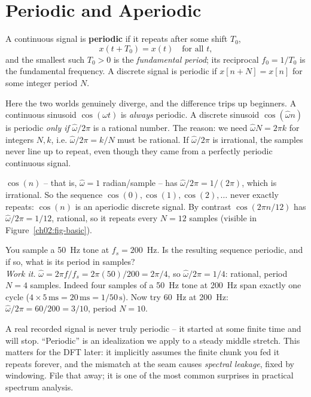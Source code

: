 \section{Periodic and Aperiodic}
\label{ch02:periodic}

A continuous signal is \textbf{periodic} if it repeats after some shift $T_0$,
\[
  x(t + T_0) = x(t) \quad \text{for all } t,
\]
and the smallest such $T_0 > 0$ is the \emph{fundamental period}; its reciprocal
$f_0 = 1/T_0$ is the fundamental frequency. A discrete signal is periodic if
$x[n+N] = x[n]$ for some integer period $N$.

Here the two worlds genuinely diverge, and the difference trips up beginners. A
continuous sinusoid $\cos(\omega t)$ is \emph{always} periodic. A discrete sinusoid
$\cos(\hat\omega n)$ is periodic \emph{only if} $\hat\omega/2\pi$ is a rational
number. The reason: we need $\hat\omega N = 2\pi k$ for integers $N, k$, i.e.
$\hat\omega/2\pi = k/N$ must be rational. If $\hat\omega/2\pi$ is irrational, the
samples never line up to repeat, even though they came from a perfectly periodic
continuous signal.

\begin{example}
\label{ch02:ex-aperiodic}
$\cos(n)$ -- that is, $\hat\omega = 1$ radian/sample -- has $\hat\omega/2\pi =
1/(2\pi)$, which is irrational. So the sequence $\cos(0), \cos(1), \cos(2), \dots$
never exactly repeats: $\cos(n)$ is an aperiodic discrete signal. By contrast
$\cos(2\pi n/12)$ has $\hat\omega/2\pi = 1/12$, rational, so it repeats every
$N=12$ samples (visible in Figure~\ref{ch02:fig-basic}).
\end{example}

\begin{walkbox}
You sample a 50~Hz tone at $f_s = 200$~Hz. Is the resulting sequence periodic, and
if so, what is its period in samples? \\[0.3em]
\emph{Work it.} $\hat\omega = 2\pi f/f_s = 2\pi (50)/200 = 2\pi/4$, so
$\hat\omega/2\pi = 1/4$: rational, period $N = 4$ samples. Indeed four samples of a
50~Hz tone at 200~Hz span exactly one cycle ($4 \times 5\,\text{ms} = 20\,\text{ms}
= 1/50\,\text{s}$). Now try 60~Hz at 200~Hz: $\hat\omega/2\pi = 60/200 = 3/10$,
period $N=10$.
\end{walkbox}

\begin{trapbox}
A real recorded signal is never truly periodic -- it started at some finite time and
will stop. ``Periodic'' is an idealization we apply to a steady middle stretch.
This matters for the DFT later: it implicitly assumes the finite chunk you fed it
repeats forever, and the mismatch at the seam causes \emph{spectral leakage}, fixed
by windowing. File that away; it is one of the most common surprises in practical
spectrum analysis.
\end{trapbox}

